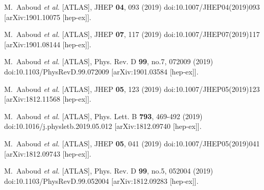 \begin{thebibliography}{9}
M.~Aaboud \textit{et al.} [ATLAS],
JHEP \textbf{04}, 093 (2019)
doi:10.1007/JHEP04(2019)093
[arXiv:1901.10075 [hep-ex]].

M.~Aaboud \textit{et al.} [ATLAS],
JHEP \textbf{07}, 117 (2019)
doi:10.1007/JHEP07(2019)117
[arXiv:1901.08144 [hep-ex]].

M.~Aaboud \textit{et al.} [ATLAS],
Phys. Rev. D \textbf{99}, no.7, 072009 (2019)
doi:10.1103/PhysRevD.99.072009
[arXiv:1901.03584 [hep-ex]].

M.~Aaboud \textit{et al.} [ATLAS],
JHEP \textbf{05}, 123 (2019)
doi:10.1007/JHEP05(2019)123
[arXiv:1812.11568 [hep-ex]].

M.~Aaboud \textit{et al.} [ATLAS],
Phys. Lett. B \textbf{793}, 469-492 (2019)
doi:10.1016/j.physletb.2019.05.012
[arXiv:1812.09740 [hep-ex]].

M.~Aaboud \textit{et al.} [ATLAS],
JHEP \textbf{05}, 041 (2019)
doi:10.1007/JHEP05(2019)041
[arXiv:1812.09743 [hep-ex]].

M.~Aaboud \textit{et al.} [ATLAS],
Phys. Rev. D \textbf{99}, no.5, 052004 (2019)
doi:10.1103/PhysRevD.99.052004
[arXiv:1812.09283 [hep-ex]].


\end{thebibliography}
